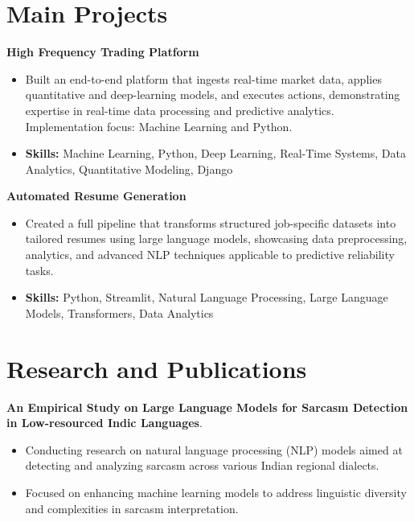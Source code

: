 \documentclass[a4paper,11pt]{article}
\begin{document}
\section{\textbf{Main Projects}}

\vspace{1mm}
  \textbf{High Frequency Trading Platform  }
\vspace{-1.5mm} %
\begin{itemize}
  \item Built an end-to-end platform that ingests real-time market data, applies quantitative and deep-learning models, and executes actions, demonstrating expertise in real-time data processing and predictive analytics. Implementation focus: Machine Learning and Python.
\vspace{-3mm}
  \item \textbf{Skills:} Machine Learning, Python, Deep Learning, Real-Time Systems, Data Analytics, Quantitative Modeling, Django
\end{itemize}


\vspace{1mm}
   \textbf{Automated Resume Generation }
\vspace{-1.5mm} %
\begin{itemize}
  \item Created a full pipeline that transforms structured job-specific datasets into tailored resumes using large language models, showcasing data preprocessing, analytics, and advanced NLP techniques applicable to predictive reliability tasks.
\vspace{-3mm}
  \item \textbf{Skills:} Python, Streamlit, Natural Language Processing, Large Language Models, Transformers, Data Analytics
\end{itemize}



\section{\textbf{Research and Publications} \hfill }
\vspace{1mm}
  \textbf{An Empirical Study on Large Language Models for Sarcasm Detection in Low-resourced Indic Languages}.
\vspace{-1mm} %
\begin{itemize}
  \item Conducting research on natural language processing (NLP) models aimed at detecting and analyzing sarcasm across various Indian regional dialects.
\vspace{-3mm}
  \item Focused on enhancing machine learning models to address linguistic diversity and complexities in sarcasm interpretation.
\end{itemize}
\end{document}
